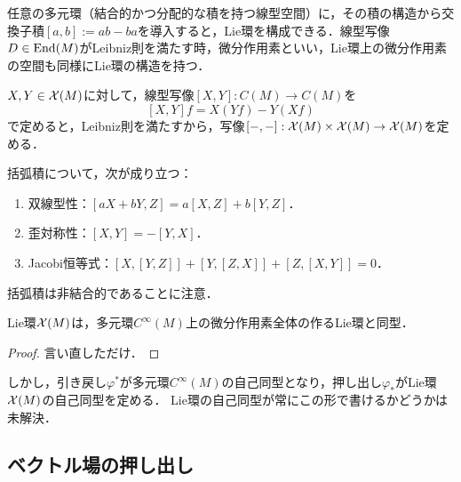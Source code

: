 \documentclass[uplatex,dvipdfmx]{jsreport}
\begin{document}
\begin{tcolorbox}[colframe=ForestGreen, colback=ForestGreen!10!white,breakable,colbacktitle=ForestGreen!40!white,coltitle=black,fonttitle=\bfseries\sffamily,
title=]
    任意の多元環（結合的かつ分配的な積を持つ線型空間）に，その積の構造から交換子積$[a,b]:=ab-ba$を導入すると，Lie環を構成できる．線型写像$D\in\mathrm{End}(M)$がLeibniz則を満たす時，微分作用素といい，Lie環上の微分作用素の空間も同様にLie環の構造を持つ．
\end{tcolorbox}

\begin{definition}[括弧積]
    $X,Y\in\mathcal{X}(M)$に対して，線型写像$[X,Y]:C(M)\to C(M)$を
    \[[X,Y]f=X(Yf)-Y(Xf)\]
    で定めると，Leibniz則を満たすから，写像$[-,-]:\mathcal{X}(M)\times\mathcal{X}(M)\to\mathcal{X}(M)$を定める．
\end{definition}

\begin{lemma}[Lie環の構造を持つ]
    括弧積について，次が成り立つ：
    \begin{enumerate}
        \item 双線型性：$[aX+bY,Z]=a[X,Z]+b[Y,Z]$．
        \item 歪対称性：$[X,Y]=-[Y,X]$．
        \item Jacobi恒等式：$[X,[Y,Z]]+[Y,[Z,X]]+[Z,[X,Y]]=0$．
    \end{enumerate}
    括弧積は非結合的であることに注意．
\end{lemma}

\begin{theorem}
    Lie環$\mathcal{X}(M)$は，多元環$C^\infty(M)$上の微分作用素全体の作るLie環と同型．
\end{theorem}
\begin{proof}
    言い直しただけ．
\end{proof}
\begin{remarks}
    しかし，引き戻し$\varphi^*$が多元環$C^\infty(M)$の自己同型となり，押し出し$\varphi_*$がLie環$\mathcal{X}(M)$の自己同型を定める．
    Lie環の自己同型が常にこの形で書けるかどうかは未解決．
\end{remarks}

\subsection{ベクトル場の押し出し}
\end{document}

